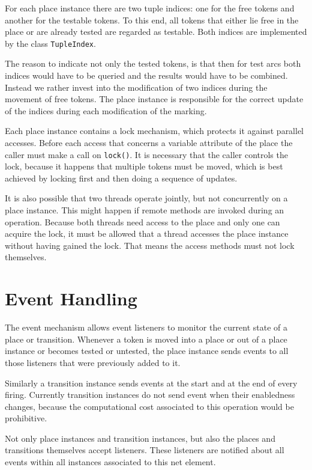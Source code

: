 For each place instance there are two tuple indices: one for the free tokens
and another for the testable tokens. To this end, all tokens that
either lie free in the place or are already tested are regarded as
testable. Both indices are implemented by the class
\texttt{TupleIndex}.

The reason to indicate not only the tested tokens, is that then for test arcs
both indices would have to be queried and the results would have to
be combined. Instead
we rather invest into the modification of two indices during the movement of
free tokens. The place instance is responsible for the correct update
of the indices during each modification of the marking.

Each place instance contains a lock mechanism, which protects it
against parallel accesses. 
Before each access that concerns a variable attribute of the
place the caller must make a call on \texttt{lock()}. It is necessary
that the caller controls the lock, because it happens that multiple tokens
must be moved, which is best achieved by locking first and then doing
a sequence of updates.


It is also possible that two threads operate jointly, but not concurrently
on a place instance. This might happen if remote methods are invoked
during an operation. Because both threads need access to the
place and only one can acquire the lock, it must be allowed
that a thread accesses the place instance without having gained the
lock. That means the access methods must not lock themselves.


\section{Event Handling}

The event mechanism allows event listeners to monitor the current 
state of a place or transition. Whenever a token is moved
into a place or out of a place instance or becomes tested or
untested, the place instance sends events to all those
listeners that were previously added to it.

Similarly a transition instance sends events at the start and at 
the end of every firing. Currently transition instances do not send 
event when their enabledness changes, because the computational cost
associated to this operation would be prohibitive.

Not only place instances and transition instances, but also the
places and transitions themselves accept listeners.
These listeners are notified about all events within all
instances associated to this net element.

